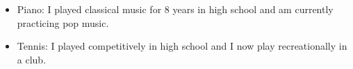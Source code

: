 \begin{itemize}[itemsep=-0.2em]
    \item Piano: I played classical music for 8 years in high school and am currently practicing pop music.
    \item Tennis: I played competitively in high school and  I now play recreationally in a club.
\end{itemize}
